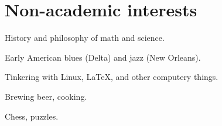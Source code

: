 \documentclass[11pt,letterpaper]{article}
\begin{document}
\section*{Non-academic interests}
\begin{description}
  \item History and philosophy of math and science.
  \item Early American blues (Delta) and jazz (New Orleans).
  \item Tinkering with Linux, \LaTeX{}, and other computery things.
  \item Brewing beer, cooking.
  \item Chess, puzzles.
\end{description}
\end{document}
